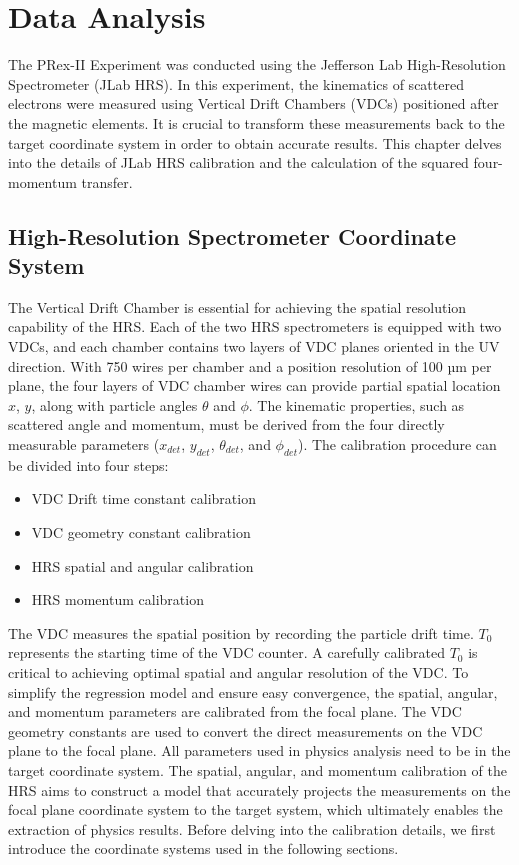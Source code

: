 \chapter{Data Analysis}

The PRex-II Experiment was conducted using the Jefferson Lab High-Resolution Spectrometer (JLab HRS). In this experiment, the kinematics of scattered electrons were measured using Vertical Drift Chambers (VDCs) positioned after the magnetic elements. It is crucial to transform these measurements back to the target coordinate system in order to obtain accurate results. This chapter delves into the details of JLab HRS calibration and the calculation of the squared four-momentum transfer.

\section{High-Resolution Spectrometer Coordinate System}

The Vertical Drift Chamber is essential for achieving the spatial resolution capability of the HRS. Each of the two HRS spectrometers is equipped with two VDCs, and each chamber contains two layers of VDC planes oriented in the UV direction. With 750 wires per chamber and a position resolution of 100 µm per plane, the four layers of VDC chamber wires can provide partial spatial location $x$, $y$, along with particle angles $\theta$ and $\phi$. The kinematic properties, such as scattered angle and momentum, must be derived from the four directly measurable parameters ($x_{det}$, $y_{det}$, $\theta_{det}$, and $\phi_{det}$). The calibration procedure can be divided into four steps:

\begin{itemize}
\item VDC Drift time constant calibration
\item VDC geometry constant calibration
\item HRS spatial and angular calibration
\item HRS momentum calibration
\end{itemize}

The VDC measures the spatial position by recording the particle drift time. $T_0$ represents the starting time of the VDC counter. A carefully calibrated $T_0$ is critical to achieving optimal spatial and angular resolution of the VDC. To simplify the regression model and ensure easy convergence, the spatial, angular, and momentum parameters are calibrated from the focal plane. The VDC geometry constants are used to convert the direct measurements on the VDC plane to the focal plane. All parameters used in physics analysis need to be in the target coordinate system. The spatial, angular, and momentum calibration of the HRS aims to construct a model that accurately projects the measurements on the focal plane coordinate system to the target system, which ultimately enables the extraction of physics results. Before delving into the calibration details, we first introduce the coordinate systems used in the following sections.

